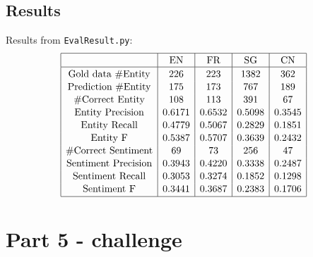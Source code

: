 \documentclass[12pt]{article}
\begin{document}
\subsection{Results}
Results from \verb|EvalResult.py|:
\[
\begin{array}{|c|c|c|c|c|}
\hline \rule{0pt}{1em}
& \mbox{EN} & \mbox{FR} & \mbox{SG} & \mbox{CN} \\
\hline \rule{0pt}{1em}
\mbox{Gold data \#Entity} & 226    & 223    & 1382   & 362    \\[0.1em]
\mbox{Prediction \#Entity}& 175    & 173    & 767    & 189    \\[0.1em]
\mbox{\#Correct Entity}   & 108    & 113    & 391    & 67     \\[0.1em]
\mbox{Entity Precision}   & 0.6171 & 0.6532 & 0.5098 & 0.3545 \\[0.1em]
\mbox{Entity Recall}      & 0.4779 & 0.5067 & 0.2829 & 0.1851 \\[0.1em]
\mbox{Entity F}           & 0.5387 & 0.5707 & 0.3639 & 0.2432 \\[0.1em]
\mbox{\#Correct Sentiment}& 69     & 73     & 256    & 47     \\[0.1em]
\mbox{Sentiment Precision}& 0.3943 & 0.4220 & 0.3338 & 0.2487 \\[0.1em]
\mbox{Sentiment Recall}   & 0.3053 & 0.3274 & 0.1852 & 0.1298 \\[0.1em]
\mbox{Sentiment F}        & 0.3441 & 0.3687 & 0.2383 & 0.1706 \\[0.1em] 
\hline
\end{array}
\]



\pagebreak

\section{Part 5 - challenge}
\end{document}
